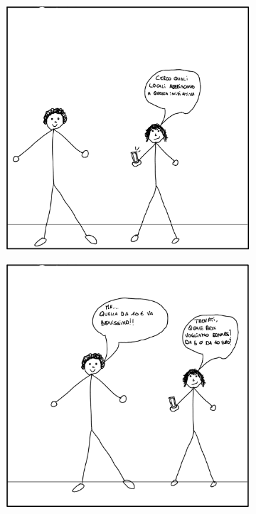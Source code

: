 \documentclass{article}
\begin{document}
\begin{figure}[H]
\begin{subfigure}{0.25\textwidth}
        \includegraphics[width=\textwidth]{Storyboard/task1-img/t1.2.png}
    \end{subfigure}
    \hspace{0.02\textwidth}
    \begin{subfigure}{0.25\textwidth}
        \centering
        \includegraphics[width=\textwidth]{Storyboard/task1-img/t1.3.png}

\end{subfigure}
\end{figure}
\end{document}
